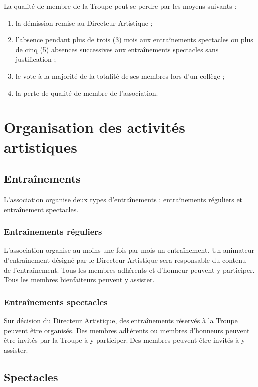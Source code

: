 \documentclass[a4paper,french,10pt]{article}
\begin{document}
La qualité de membre de la Troupe peut se perdre par les moyens suivants :

\begin{enumerate}
	\item la démission remise au Directeur Artistique ;
	\item l'absence pendant plus de trois  (3) mois aux entraînements spectacles ou plus de cinq (5) absences successives aux entraînements spectacles sans justification ;
	\item le vote à la majorité de la totalité de ses membres lors d'un collège ;
	\item la perte de qualité de membre de l'association.

\end{enumerate}



\section{Organisation des activités artistiques}
\subsection{Entraînements}
L'association organise deux types d'entraînements : entraînements réguliers et entraînement spectacles.

\subsubsection{Entraînements réguliers}
L'association organise au moins une fois par mois un entraînement. Un animateur d'entraînement désigné par le Directeur Artistique sera responsable du contenu de l'entraînement. Tous les membres adhérents et d'honneur peuvent y participer. Tous les membres bienfaiteurs peuvent y assister.

\subsubsection{Entraînements spectacles}
Sur décision du Directeur Artistique, des entraînements réservés à la Troupe peuvent être organisés. Des membres adhérents ou membres d'honneurs peuvent être invités par la Troupe à y participer. Des membres peuvent être invités à y assister.

\subsection{Spectacles}
\label{sec:spectacles}
\end{document}

